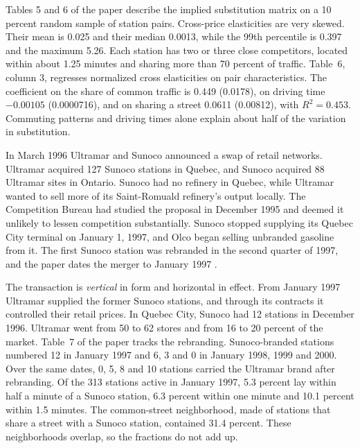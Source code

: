 Tables 5 and 6 of the paper describe the implied substitution matrix on a 10 percent random sample of station pairs.
Cross-price elasticities are very skewed. Their mean is 0.025 and their median 0.0013, while the 99th percentile is
0.397 and the maximum 5.26. Each station has two or three close competitors, located within about 1.25 minutes and
sharing more than 70 percent of traffic. Table~6, column 3, regresses normalized cross elasticities on pair
characteristics. The coefficient on the share of common traffic is 0.449 (0.0178), on driving time $-0.00105$
(0.0000716), and on sharing a street 0.0611 (0.00812), with $R^2 = 0.453$. Commuting patterns and driving times alone
explain about half of the variation in substitution.

In March 1996 Ultramar and Sunoco announced a swap of retail networks. Ultramar acquired 127 Sunoco stations in
Quebec, and Sunoco acquired 88 Ultramar sites in Ontario. Sunoco had no refinery in Quebec, while Ultramar wanted to
sell more of its Saint-Romuald refinery's output locally. The Competition Bureau had studied the proposal in December
1995 and deemed it unlikely to lessen competition substantially. Sunoco stopped supplying its Quebec City terminal on
January 1, 1997, and Olco began selling unbranded gasoline from it. The first Sunoco station was rebranded in the
second quarter of 1997, and the paper dates the merger to January 1997 \citep[p.~2167]{Houde2012}.

The transaction is \emph{vertical} in form and horizontal in effect. From January 1997 Ultramar supplied the former
Sunoco stations, and through its contracts it controlled their retail prices. In Quebec City, Sunoco had 12 stations
in December 1996. Ultramar went from 50 to 62 stores and from 16 to 20 percent of the market. Table~7 of the paper
tracks the rebranding. Sunoco-branded stations numbered 12 in January 1997 and 6, 3 and 0 in January 1998, 1999 and
2000. Over the same dates, 0, 5, 8 and 10 stations carried the Ultramar brand after rebranding. Of the 313 stations
active in January 1997, 5.3 percent lay within half a minute of a Sunoco station, 6.3 percent within one minute and
10.1 percent within 1.5 minutes. The common-street neighborhood, made of stations that share a street with a Sunoco
station, contained 31.4 percent. These neighborhoods overlap, so the fractions do not add up.

